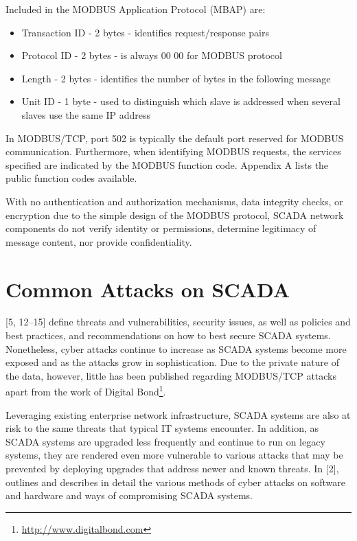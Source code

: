 \documentclass[11pt,]{article}
\begin{document}
Included in the MODBUS Application Protocol (MBAP) are:

\begin{itemize}
\itemsep1pt\parskip0pt
\item
  Transaction ID - 2 bytes - identifies request/response pairs
\item
  Protocol ID - 2 bytes - is always 00 00 for MODBUS protocol
\item
  Length - 2 bytes - identifies the number of bytes in the following
  message
\item
  Unit ID - 1 byte - used to distinguish which slave is addressed when
  several slaves use the same IP address
\end{itemize}

In MODBUS/TCP, port 502 is typically the default port reserved for
MODBUS communication. Furthermore, when identifying MODBUS requests, the
services specified are indicated by the MODBUS function code. Appendix A
lists the public function codes available.

With no authentication and authorization mechanisms, data integrity
checks, or encryption due to the simple design of the MODBUS protocol,
SCADA network components do not verify identity or permissions,
determine legitimacy of message content, nor provide confidentiality.

\clearpage

\section{Common Attacks on SCADA}\label{common-attacks-on-scada}

{[}5, 12--15{]} define threats and vulnerabilities, security issues, as
well as policies and best practices, and recommendations on how to best
secure SCADA systems. Nonetheless, cyber attacks continue to increase as
SCADA systems become more exposed and as the attacks grow in
sophistication. Due to the private nature of the data, however, little
has been published regarding MODBUS/TCP attacks apart from the work of
Digital Bond\footnote{\url{http://www.digitalbond.com}}.

Leveraging existing enterprise network infrastructure, SCADA systems are
also at risk to the same threats that typical IT systems encounter. In
addition, as SCADA systems are upgraded less frequently and continue to
run on legacy systems, they are rendered even more vulnerable to various
attacks that may be prevented by deploying upgrades that address newer
and known threats. In {[}2{]}, outlines and describes in detail the
various methods of cyber attacks on software and hardware and ways of
compromising SCADA systems.
\end{document}
